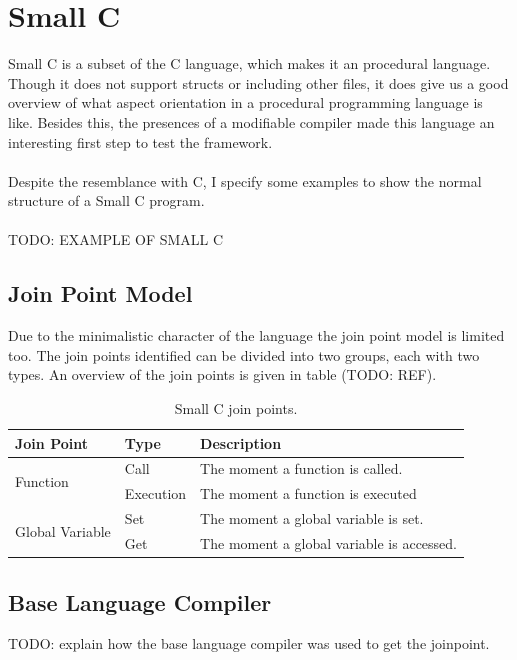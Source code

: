 \documentclass[a4paper]{report}
\begin{document}
\chapter{Small C}
Small C is a subset of the C language, which makes it an procedural language. Though it does not support structs or including other files, it does give us a good overview of what aspect orientation in a procedural programming language is like. Besides this, the presences of a modifiable compiler made this language an interesting first step to test the framework.\\
\\
Despite the resemblance with C, I specify some examples to show the normal structure of a Small C program.\\
\\
TODO: EXAMPLE OF SMALL C

\section{Join Point Model}
Due to the minimalistic character of the language the join point model is limited too. The join points identified can be divided into two groups, each with two types. An overview of the join points is given in table (TODO: REF).
\begin{table}
\centering
\begin{tabular}{|l|l|l|}
\hline
Join Point & Type & Description\\
\hline
\multirow{2}{*}{Function} & Call & The moment a function is called.\\
& Execution & The moment a function is executed\\
\hline
\multirow{2}{*}{Global Variable} & Set & The moment a global variable is set.\\
& Get & The moment a global variable is accessed.\\
\hline
\end{tabular}
\label{tab:SmallC_JoinPoints}
\caption{Small C join points.}
\end{table}

\section{Base Language Compiler}
TODO: explain how the base language compiler was used to get the joinpoint.
\end{document}
